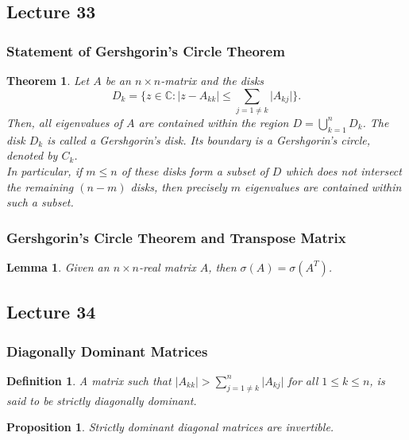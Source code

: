 \documentclass{article}
\newtheorem{theorem}{Theorem}
\newtheorem{lemma}{Lemma}
\newtheorem{definition}{Definition}
\newtheorem{proposition}{Proposition}
\begin{document}
\subsection{Lecture 33}
\subsubsection{Statement of Gershgorin's Circle Theorem}
\begin{theorem}
    Let $A$ be an $n\times n$-matrix and the disks
    \begin{equation}
        D_k = \{ z\in \mathbb{C} : \vert z-A_{kk}\vert \leq \sum_{j=1\neq k} \vert A_{kj}\vert \}. \nonumber
    \end{equation}
    Then, all eigenvalues of $A$ are contained within the region $D = \bigcup_{k=1}^n D_k$. The disk $D_k$ is called a Gershgorin's disk. Its boundary is a Gershgorin's circle, denoted by $C_k$.\\
    In particular, if $m\leq n$ of these disks form a subset of $D$ which does not intersect the remaining $(n-m)$ disks, then precisely $m$ eigenvalues are contained within such a subset.
\end{theorem}

\subsubsection{Gershgorin's Circle Theorem and Transpose Matrix}
\begin{lemma}
    Given an $n\times n$-real matrix $A$, then $\sigma (A) = \sigma (A^T)$. \nonumber 
\end{lemma}

\subsection{Lecture 34}
\subsubsection{Diagonally Dominant Matrices}
\begin{definition}
    A matrix such that $\vert A_{kk}\vert > \sum_{j=1\neq k}^n \vert A_{kj} \vert$ for all $1\leq k \leq n$, is said to be strictly diagonally dominant.
\end{definition}
\begin{proposition}
    Strictly dominant diagonal matrices are invertible.
\end{proposition}
\end{document}
